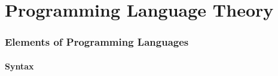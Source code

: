 
\part*{Programming Language Theory}




\toclineskip
\section{Elements of Programming Languages}






\subsection{Syntax}

